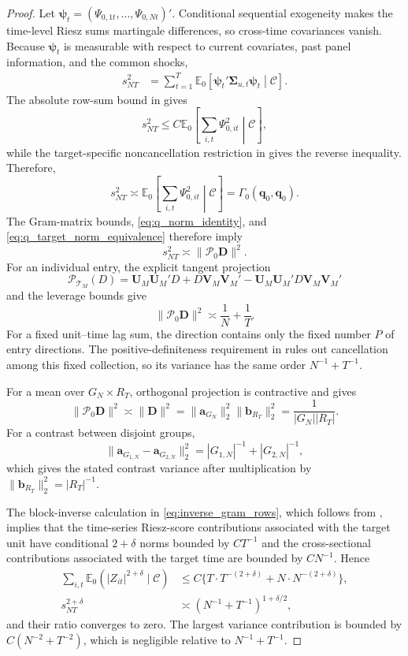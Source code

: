 \documentclass[11pt]{article}
\numberwithin{equation}{section}
\theoremstyle{remark}
\newcommand{\Ezero}{\mathbb E_0}
\newcommand{\bq}{\bm q}
\newcommand{\bD}{\bm D}
\newcommand{\bU}{\bm U}
\newcommand{\bV}{\bm V}
\newcommand{\calP}{\mathcal P}
\newcommand{\calT}{\mathcal T}
\begin{document}
\begin{proof}
Let $\bm\psi_t=(\Psi_{0,1t},\ldots,\Psi_{0,Nt})'$. Conditional sequential exogeneity makes the time-level Riesz sums martingale differences, so cross-time covariances vanish. Because $\bm\psi_t$ is measurable with respect to current covariates, past panel information, and the common shocks,
$$
\begin{aligned}
s_{NT}^2
&=
\sum_{t=1}^{T}
\Ezero\left[
\bm\psi_t'
\bm\Sigma_{u,t}
\bm\psi_t
\middle|\mathscr C
\right].
\end{aligned}
$$
The absolute row-sum bound in  gives
$$
s_{NT}^2
\le
C\Ezero\left[
\sum_{i,t}\Psi_{0,it}^{2}
\middle|\mathscr C
\right],
$$
while the target-specific noncancellation restriction in  gives the reverse inequality. Therefore,
$$
s_{NT}^2
\asymp
\Ezero\left[
\sum_{i,t}\Psi_{0,it}^{2}
\middle|\mathscr C
\right]
=
\Gamma_0(\bq_0,\bq_0).
$$
The Gram-matrix bounds, \eqref{eq:q_norm_identity}, and \eqref{eq:q_target_norm_equivalence} therefore imply
$$
s_{NT}^2
\asymp
\|\calP_0\bD\|^2.
$$
For an individual entry, the explicit tangent projection
$$
\calP_{\calT_M}(D)
=
\bU_M\bU_M'D
+
D\bV_M\bV_M'
-
\bU_M\bU_M'D\bV_M\bV_M'
$$
and the leverage bounds give
$$
\|\calP_0\bD\|^2
\asymp
\frac1N+\frac1T.
$$
For a fixed unit--time lag sum, the direction contains only the fixed number $P$ of entry directions. The positive-definiteness requirement in  rules out cancellation among this fixed collection, so its variance has the same order $N^{-1}+T^{-1}$.

For a mean over $G_N\times R_T$, orthogonal projection is contractive and  gives
$$
\|\calP_0\bD\|^2
\asymp
\|\bD\|^2
=
\|\bm a_{G_N}\|_2^2
\|\bm b_{R_T}\|_2^2
=
\frac1{|G_N||R_T|}.
$$
For a contrast between disjoint groups,
$$
\|\bm a_{G_{1,N}}-\bm a_{G_{2,N}}\|_2^2
=
|G_{1,N}|^{-1}+|G_{2,N}|^{-1},
$$
which gives the stated contrast variance after multiplication by $\|\bm b_{R_T}\|_2^2=|R_T|^{-1}$.

The block-inverse calculation in \eqref{eq:inverse_gram_rows}, which follows from , implies that the time-series Riesz-score contributions associated with the target unit have conditional $2+\delta$ norms bounded by $CT^{-1}$ and the cross-sectional contributions associated with the target time are bounded by $CN^{-1}$. Hence
\begin{align*}
\sum_{i,t}
\Ezero(|Z_{it}|^{2+\delta}\mid\mathscr C)
&\le
C\{T\cdot T^{-(2+\delta)}+N\cdot N^{-(2+\delta)}\},\\
s_{NT}^{2+\delta}
&\asymp
(N^{-1}+T^{-1})^{1+\delta/2},
\end{align*}
and their ratio converges to zero. The largest variance contribution is bounded by $C(N^{-2}+T^{-2})$, which is negligible relative to $N^{-1}+T^{-1}$.


\end{proof}
\end{document}
